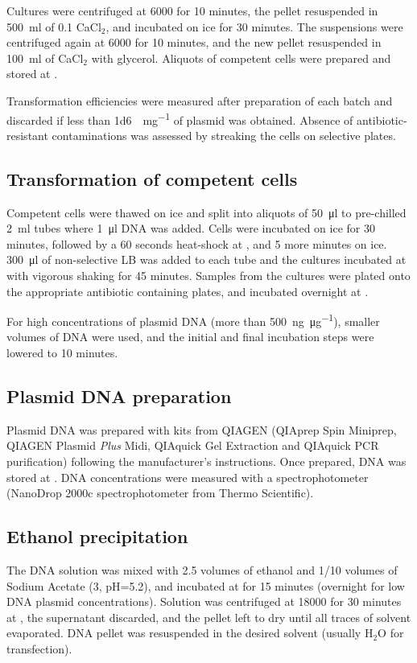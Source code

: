     Cultures were centrifuged at \SI{6000}{\gn} for 10 minutes, the pellet resuspended in
    \SI{500}{\ml} of \SI{0.1}{\mM} CaCl$_2$, and incubated on ice for 30 minutes. The suspensions
    were centrifuged again at \SI{6000}{\gn} for 10 minutes, and the new pellet resuspended in
    \SI{100}{\ml} of CaCl$_2$ with  glycerol. Aliquots of competent cells were prepared
    and stored at .
    
    Transformation efficiencies were measured after preparation of each batch and discarded
    if less than \SI{1d6}{\cfu\per\mg} of plasmid was obtained. Absence of antibiotic-resistant
    contaminations was assessed by streaking the cells on selective plates.

  \subsection{Transformation of competent cells}
    Competent cells were thawed on ice and split into aliquots of \SI{50}{\ul} to pre-chilled \SI{2}{\ml}
    tubes where \SI{1}{\ul} DNA was added. Cells were incubated on ice for 30 minutes, followed by a 60 seconds
    heat-shock at , and 5 more minutes on ice. \SI{300}{\ul} of non-selective LB was added to each tube
    and the cultures incubated at  with vigorous shaking for 45 minutes. Samples from the cultures
    were plated onto the appropriate antibiotic containing plates, and incubated overnight at .
    
    For high concentrations of plasmid DNA (more than \SI{500}{\ng\per\ug}), smaller volumes of DNA were used,
    and the initial and final incubation steps were lowered to 10 minutes.

  \subsection{Plasmid DNA preparation}
    Plasmid DNA was prepared with kits from QIAGEN (QIAprep Spin Miniprep, QIAGEN Plasmid \textit{Plus} Midi,
    QIAquick Gel Extraction and QIAquick PCR purification) following the manufacturer's instructions. Once
    prepared, DNA was stored at . DNA concentrations were measured with a spectrophotometer (NanoDrop
    2000c spectrophotometer from Thermo Scientific).

  \subsection{Ethanol precipitation}
    \label{sec:ethanol-precipitation}
    The DNA solution was mixed with \num{2.5} volumes of  ethanol and \num{1/10} volumes of
    Sodium Acetate (\SI{3}{\Molar}, pH=\num{5.2}), and incubated at  for 15 minutes (overnight for
    low DNA plasmid concentrations). Solution was centrifuged at \SI{18000}{\gn} for 30 minutes at ,
    the supernatant discarded, and the pellet left to dry until all traces of solvent evaporated. DNA pellet
    was resuspended in the desired solvent (usually H$_2$O for transfection).

